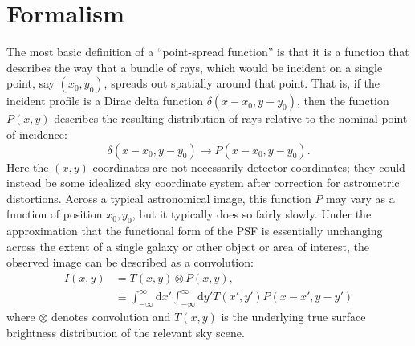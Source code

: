 \documentclass{openjournal}
\newcommand{\irresponse}[1]{{#1}}
\begin{document}
\section{Formalism}\label{sec:formalism}

The most basic definition of a ``point-spread function'' is that it is a function that describes the way that a bundle of rays, which would be incident on a single point, say $(x_0,y_0)$, spreads out spatially around that point. 
\irresponse{That is, if the incident profile is a Dirac delta function $\delta(x-x_0,y-y_0)$, then} the function $P(x,y)$ describes the resulting distribution of rays relative to the nominal point of incidence:
\begin{equation}
    \delta(x-x_0,y-y_0) \rightarrow P(x-x_0,y-y_0).
\end{equation}
\irresponse{Here the $(x,y)$ coordinates are not necessarily detector coordinates; they could instead be some idealized sky coordinate system after correction for astrometric distortions.}  
Across a typical astronomical image, this function $P$ may vary as a function of position $x_0,y_0$, but it typically does so fairly slowly.  Under the approximation that the functional form of the PSF is essentially unchanging across the extent of a single galaxy or other object or area of interest, the observed image can be described as a convolution:
\begin{align}
I(x,y) &= T(x,y) \otimes P(x,y),\\
&\equiv \int_{-\infty}^{\infty} \mathrm{d}x'
\int_{-\infty}^{\infty} \mathrm{d}y' T(x',y')P(x-x', y-y')
\end{align}
where $\otimes$ denotes convolution and $T(x,y)$ is the underlying true surface brightness distribution of the relevant sky scene.
\end{document}

